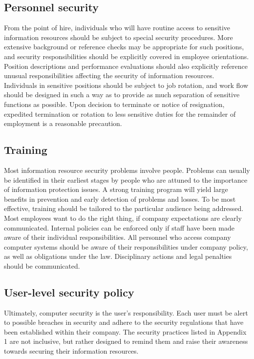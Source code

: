 \subsection{Personnel security}
From the point of hire, individuals who will have routine access to
sensitive information resources should be subject to special security
procedures. More extensive background or reference checks may be
appropriate for such positions, and security responsibilities should be
explicitly covered in employee orientations. Position descriptions and
performance evaluations should also explicitly reference unusual
responsibilities affecting the security of information resources.\\

Individuals in sensitive positions should be subject to job rotation,
and work flow should be designed in such a way as to provide as much
separation of sensitive functions as possible. Upon decision to
terminate or notice of resignation, expedited termination or rotation
to less sensitive duties for the remainder of employment is a
reasonable precaution.


\subsection{Training}
Most information resource security problems involve people. Problems
can usually be identified in their earliest stages by people who are
attuned to the importance of information protection issues. A strong
training program will yield large benefits in prevention and early
detection of problems and losses. To be most effective, training should
be tailored to the particular audience being addressed.\\

Most employees want to do the right thing, if company expectations are
clearly communicated. Internal policies can be enforced only if staff
have been made aware of their individual responsibilities. All
personnel who access company computer systems should be aware of their
responsibilities under company policy, as well as obligations under the
law. Disciplinary actions and legal penalties should be communicated.


\subsection{User-level security policy}
Ultimately, computer security is the user's responsibility. Each user
must be alert to possible breaches in security and adhere to the
security regulations that have been established within their company.
The security practices listed in Appendix 1 are not inclusive, but
rather designed to remind them and raise their awareness towards
securing their information resources.


